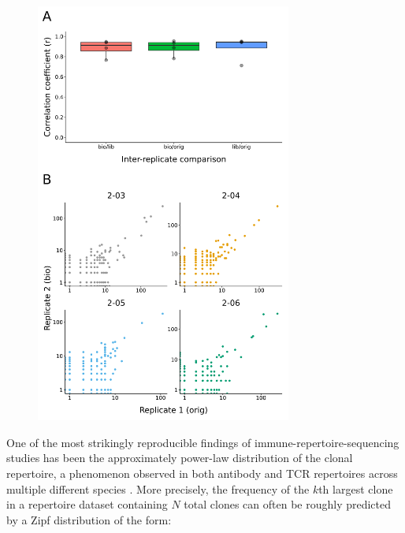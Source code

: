 \begin{figure}
\centering
\includegraphics[width = 0.75\textwidth]{_Figures/png/pilot-clone-sizes-cor}
\begin{subfigure}{0em}
\label{fig:igseq-pilot-clone-sizes-cor-boxplots}
\end{subfigure}
\begin{subfigure}{0em}
\label{fig:igseq-pilot-clone-sizes-cor-scatter}
\end{subfigure}
\label{fig:igseq-pilot-clone-sizes-cor}
\end{figure}

One of the most strikingly reproducible findings of immune-repertoire-sequencing studies has been the approximately power-law distribution of the clonal repertoire, a phenomenon observed in both antibody and TCR repertoires across multiple different species \parencite{desponds2016fluctuating,mora2016diversity}. More precisely, the frequency of the $k$th largest clone in a repertoire dataset containing $N$ total clones can often be roughly predicted by a Zipf distribution \parencite{mora2010mentropy} of the form:

